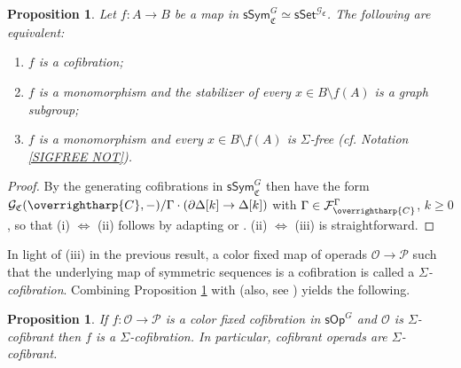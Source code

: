 \documentclass[a4paper,10pt
,draft
]{article}%
\numberwithin{equation}{section}
\numberwithin{figure}{section}
\newtheorem{proposition}[equation]{Proposition}%
\theoremstyle{definition} %
\newcommand{\vect}[1]{\text{\overrightharp{\ensuremath{#1}}}}
\renewcommand{\O}{\ensuremath{\mathcal O}}
\newcommand{\1}{\ensuremath{\mathbbm 1}}%
\begin{document}
\begin{proposition}\label{SSYMCOFCH PROP}
	Let $f \colon A \to B$ be a map in
	$\mathsf{sSym}^G_{\mathfrak{C}} \simeq \mathsf{sSet}^{\mathcal{G}_{\mathfrak{C}}}$.
	The following are equivalent:
\begin{enumerate}
	\item[(i)] $f$ is a cofibration;
	\item[(ii)] $f$ is a monomorphism and the stabilizer of every
	$x \in B \setminus f(A)$
	is a graph subgroup;
	\item[(iii)] $f$ is a monomorphism and every 
	$x \in B \setminus f(A)$ is $\Sigma$-free
	(cf. Notation \ref{SIGFREE NOT}).
\end{enumerate}
\end{proposition}

\begin{proof}
By \cite[Rem. \ref{OC-VGFGEN REM}]{BP_FCOP}
the generating cofibrations in 
$\mathsf{sSym}^G_{\mathfrak{C}}$
then have the form
$\mathcal{G}_{\mathfrak{C}}
(\vect{C},-)/\Gamma \cdot (\partial \Delta[k] \to \Delta[k])$
with $\Gamma \in \mathcal{F}^{\Gamma}_{\vect{C}}$,
$k \geq 0$,
so that (i) $\Leftrightarrow$ (ii)
follows by adapting 
\cite[Prop. 2.16]{Ste16}
or
\cite[Prop. 6.5]{Per18}.
(ii) $\Leftrightarrow$ (iii)
is straightforward.
\end{proof}



In light of (iii) in the previous result,
a color fixed map of operads
$\O \to \mathcal{P}$
such that the underlying map of symmetric sequences is a cofibration
is called a \emph{$\Sigma$-cofibration}.
%
Combining Proposition \ref{SSYMCOFCH PROP} with 
\cite[Prop. \ref{OC-SIGMAG_COF PROP}]{BP_FCOP}
(also, see \cite[Prop. \ref{AC-FIBERGLMOD PROP}(ii)]{BP_ACOP})
yields the following.


\begin{proposition}\label{COPOFSIGCOF PROP}
	If $f \colon \O \to \mathcal{P}$
	is a color fixed cofibration in $\mathsf{sOp}^G$
	and $\O$ is $\Sigma$-cofibrant
	then $f$ is a $\Sigma$-cofibration.
	In particular, cofibrant operads are $\Sigma$-cofibrant.
\end{proposition}
\end{document}
